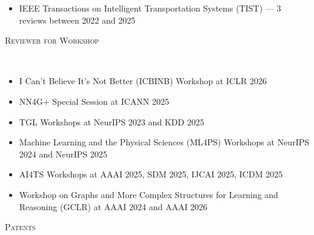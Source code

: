 \documentclass[10pt]{article}
\newenvironment{changemargin}[2]{
  \begin{list}{}{
    \setlength{\topsep}{0pt}
    \setlength{\leftmargin}{#1}
    \setlength{\rightmargin}{#2}
    \setlength{\listparindent}{\parindent}
    \setlength{\itemindent}{\parindent}
    \setlength{\parsep}{\parskip}
  }
  \item[]}{\end{list}
}
\newcommand{\lineover}{
	\begin{changemargin}{-0.05in}{-0.05in}
		\vspace*{-8pt}
		\hrulefill \\
		\vspace*{-2pt}
	\end{changemargin}
}
\newcommand{\header}[1]{
	\begin{changemargin}{-0.5in}{-0.5in}
		\scshape{#1}\\
  	\lineover
	\end{changemargin}
}
\newenvironment{body} {
	\vspace*{-16pt}
	\begin{changemargin}{-0.25in}{-0.5in}
  }
	{\end{changemargin}
}
\begin{document}
\begin{body}
\begin{itemize}
        \item IEEE Transactions on Intelligent Transportation Systems (TIST) — 3 reviews between 2022 and 2025
    \end{itemize}
    \vspace{1em}
   \textsc{Reviewer for Workshop}
    \lineover
    \begin{itemize}
        \item I Can’t Believe It’s Not Better (ICBINB) Workshop at ICLR 2026
        \item NN4G+ Special Session at ICANN 2025
        \item TGL Workshops at NeurIPS 2023 and KDD 2025
        \item Machine Learning and the Physical Sciences (ML4PS) Workshops at NeurIPS 2024 and NeurIPS 2025
        \item AI4TS Workshops at AAAI 2025,  SDM 2025,  IJCAI 2025, ICDM 2025
        \item Workshop on Graphs and More Complex Structures for Learning and Reasoning (GCLR) at AAAI 2024 and AAAI 2026
    \end{itemize}
\end{body}

\medskip

\header{Patents}
\end{document}
